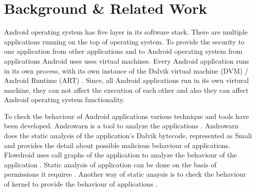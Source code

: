 \chapter{Background \& Related Work}
\label{ch:sentiment}

\thispagestyle{empty}
Android operating system has five layer in its software stack. There are multiple applications running on the top of operating system. To provide the security to one application from other applications and to Android operating system from applications Android uses uses virtual machines. Every Android application runs  in its own process, with its own instance of the Dalvik virtual machine (DVM) \cite{wiki:dalvik} / Android Runtime (ART) \cite{androidruntime}. Since, all Android applications run in its own virtural machine, they can not affect the execution of each other and also they can affect Android operating system functionality.

To check the behaviour of Android applications various technique and tools have been developed. Androwarn is a tool to analyze the applications \cite{androwarn}. Androwarn does the static analysis of the application's Dalvik bytecode, represented as Smali and provides the detail about possible malicious behaviour of applications. Flowdroid uses call graphs of the application to analyze the behaviour of the application \cite{arzt2014flowdroid}. Static analysis of application can be done on the basis of permissions it requires \cite{johnson2012analysis}. Another way of static anaysis is to check the behaviour of kernel to provide the behaviour of applications \cite{isohara2011kernel}. 


